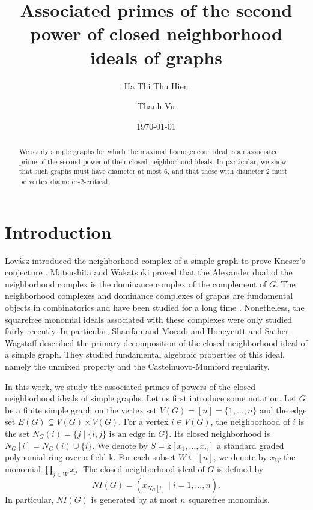 \documentclass[12pt,reqno,twoside]{amsart}
\title{Associated primes of the second power of closed neighborhood ideals of graphs}
\author{Ha Thi Thu Hien}
\author{Thanh Vu}
\date{\today}
\newcommand{\kk}{\mathrm k}
\theoremstyle{definition}
\theoremstyle{plain}
\theoremstyle{remark}
\numberwithin{equation}{section}
\begin{document}
\begin{abstract} We study simple graphs for which the maximal homogeneous ideal is an associated prime of the second power of their closed neighborhood ideals. In particular, we show that such graphs must have diameter at most $6$, and that those with diameter $2$ must be vertex diameter-$2$-critical.
\end{abstract}

\maketitle

\section{Introduction} 
Lov\'asz introduced the neighborhood complex of a simple graph to prove Kneser's conjecture \cite{L}. Matsushita and Wakatsuki \cite{MW} proved that the Alexander dual of the neighborhood complex is the dominance complex of the complement of $G$. The neighborhood complexes and dominance complexes of graphs are fundamental objects in combinatorics and have been studied for a long time \cite{B}. Nonetheless, the squarefree monomial ideals associated with these complexes were only studied fairly recently. In particular, Sharifan and Moradi \cite{SM} and Honeycutt and Sather-Wagstaff \cite{HS} described the primary decomposition of the closed neighborhood ideal of a simple graph. They studied fundamental algebraic properties of this ideal, namely the unmixed property and the Castelnuovo-Mumford regularity. 

In this work, we study the associated primes of powers of the closed neighborhood ideals of simple graphs. Let us first introduce some notation. Let $G$ be a finite simple graph on the vertex set $V(G) = [n] = \{1,\ldots,n\}$ and the edge set $E(G) \subseteq V(G) \times V(G)$. For a vertex $i \in V(G)$, the neighborhood of $i$ is the set $N_G(i) = \{j \mid \{i,j\} \text{ is an edge in } G\}$. Its closed neighborhood is $N_G[i] = N_G(i) \cup \{i\}$. We denote by $S = \kk[x_1,\ldots,x_n]$ a standard graded polynomial ring over a field $\kk$. For each subset $W \subseteq [n]$, we denote by $x_W$ the monomial $\prod_{j\in W} x_j$. The closed neighborhood ideal of $G$ is defined by
$$NI(G) = (x_{N_G[i]} \mid i = 1, \ldots, n).$$
In particular, $NI(G)$ is generated by at most $n$ squarefree monomials. 
\end{document}

